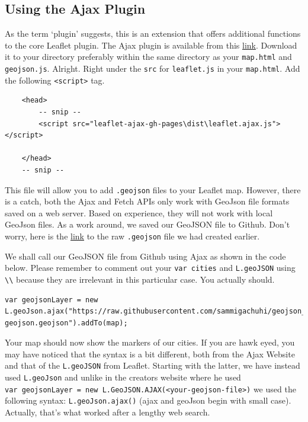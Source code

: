 \documentclass[
]{book}
\begin{document}
\hypertarget{using-the-ajax-plugin}{%
\subsection{Using the Ajax Plugin}\label{using-the-ajax-plugin}}

As the term `plugin' suggests, this is an extension that offers additional functions to the core Leaflet plugin. The Ajax plugin is available from this \href{https://github.com/calvinmetcalf/leaflet-ajax/archive/refs/heads/gh-pages.zip}{link}. Download it to your directory preferably within the same directory as your \texttt{map.html} and \texttt{geojson.js}. Alright. Right under the \texttt{src} for \texttt{leaflet.js} in your \texttt{map.html}. Add the following \texttt{\textless{}script\textgreater{}} tag.

\begin{verbatim}
    <head>
        -- snip --
        <script src="leaflet-ajax-gh-pages\dist\leaflet.ajax.js"></script>
        
    </head>
    -- snip --
\end{verbatim}

This file will allow you to add \texttt{.geojson} files to your Leaflet map. However, there is a catch, both the Ajax and Fetch APIs only work with GeoJson file formats saved on a web server. Based on experience, they will not work with local GeoJson files. As a work around, we saved our GeoJSON file to Github. Don't worry, here is the \href{https://raw.githubusercontent.com/sammigachuhi/geojson_files/main/cities-geojson.geojson}{link} to the raw \texttt{.geojson} file we had created earlier.

We shall call our GeoJSON file from Github using Ajax as shown in the code below. Please remember to comment out your \texttt{var\ cities} and \texttt{L.geoJSON} using \texttt{\textbackslash{}\textbackslash{}} because they are irrelevant in this particular case. You actually should.

\begin{verbatim}
var geojsonLayer = new L.geoJson.ajax("https://raw.githubusercontent.com/sammigachuhi/geojson_files/main/cities-geojson.geojson").addTo(map);
\end{verbatim}

Your map should now show the markers of our cities. If you are hawk eyed, you may have noticed that the syntax is a bit different, both from the Ajax Website and that of the \texttt{L.geoJSON} from Leaflet. Starting with the latter, we have instead used \texttt{L.geoJson} and unlike in the creators website where he used \texttt{var\ geojsonLayer\ =\ new\ L.GeoJSON.AJAX(\textless{}your-geojson-file\textgreater{})} we used the following syntax: \texttt{L.geoJson.ajax()} (ajax and geoJson begin with small case). Actually, that's what worked after a lengthy web search.
\end{document}
